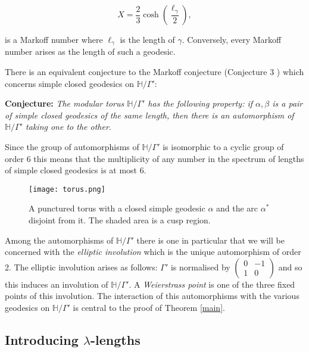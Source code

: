\documentclass[12pt,a4paper]{amsart}
\def\HH{\mathbb{H}}
\def\xx{\HH/\Gamma'}
\begin{document}
\begin{equation} X  = \frac{2}{3} \cosh \left(
\frac{\ell_\gamma}{2}\right),
\end{equation} 

is a Markoff number where
$\ell_\gamma$ is the length of $\gamma$. Conversely, every Markoff number
arises as the length of such a geodesic.

There is an equivalent conjecture to the Markoff conjecture (Conjecture 3
\cite{mcp}) which concerns simple closed geodesics on $\xx$:

\noindent
\textbf{Conjecture:} \textit{The modular torus $\xx$ has the following property: if $\alpha, \beta$
is a pair of simple closed geodesics of the same length, then there is an
automorphism  of $\xx$ taking one to the other.}

Since the group of automorphisms of $\xx$ is isomorphic to a cyclic group of
order 6 this means that the multiplicity of any number in the spectrum of
lengths of simple closed geodesics is at most 6.

\begin{figure}[ht]
\begin{center}
\texttt{[image: torus.png]} 
\end{center}
\caption{A punctured torus with a closed simple geodesic $\alpha$ and the arc $\alpha^*$ disjoint from it. The shaded area is a cusp region.}
	\label{fig:torus}
\end{figure}

Among the automorphisms of $\xx$ there is one in particular that we will be
concerned with the \textit{elliptic involution} which is the unique
automorphism of order 2. The elliptic involution arises as follows: $\Gamma'$
is normalised by $\begin{pmatrix} 0 & -1 \\ 1 & 0 \end{pmatrix}$ and so this
induces an involution of $\xx$. A \textit{Weierstrass point} is one of the
three fixed points of this involution. The interaction of this automorphisms
with the various geodesics on $\xx$ is central to the proof of Theorem
\ref{main}.

\subsection{Introducing $\lambda$-lengths}

\end{document}

